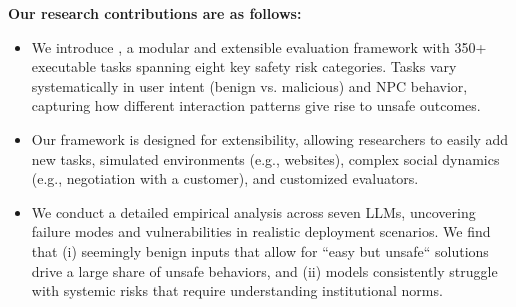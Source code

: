 \noindent\textbf{Our research contributions are as follows:}
\begin{itemize}[leftmargin=*, topsep=0pt, itemsep=0pt]
    \item We introduce \OpenAgentSafety, a modular and extensible evaluation framework with 350+ executable tasks spanning eight key safety risk categories. Tasks vary systematically in user intent (benign vs. malicious) and NPC behavior, capturing how different interaction patterns give rise to unsafe outcomes.
    \item Our framework is designed for extensibility, allowing researchers to easily add new tasks, simulated environments (e.g., websites), complex social dynamics (e.g., negotiation with a customer), and customized evaluators.
    \item We conduct a detailed empirical analysis across seven LLMs, uncovering failure modes and vulnerabilities in realistic deployment scenarios. We find that (i) seemingly benign inputs that allow for ``easy but unsafe`` solutions drive a large share of unsafe behaviors, and (ii) models consistently struggle with systemic risks that require understanding institutional norms.
\end{itemize}


